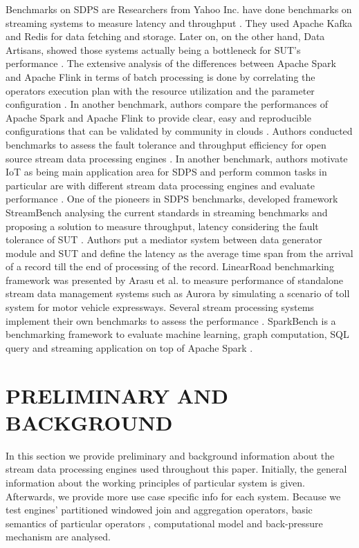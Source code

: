 \documentclass{vldb}
\begin{document}
 Benchmarks on SDPS are  Researchers from Yahoo Inc. have done benchmarks on streaming systems to measure latency and throughput \cite{chintapalli2016benchmarking}. They used Apache Kafka \cite{kafka2014high} and Redis \cite{carlson2013redis} for data fetching and storage. Later on, on the other hand, Data Artisans, showed those systems actually being a bottleneck for SUT's performance \cite{dataartisans}.  The extensive analysis of the differences between Apache Spark and Apache Flink in terms of batch processing is done by correlating the operators execution plan with the resource utilization and the parameter configuration \cite{marcu2016spark}. In another benchmark, authors compare the performances of Apache Spark and Apache Flink to  provide clear, easy and reproducible configurations that can be validated by community in clouds \cite{perera2016reproducible}. Authors conducted  benchmarks to assess the fault tolerance and throughput efficiency for open source stream data processing engines \cite{lopez2016performance}. In another benchmark, authors motivate IoT as being main application area for SDPS and perform common tasks in particular are with different stream data processing engines and evaluate performance \cite{shukla2016benchmarking}. One of the pioneers in SDPS benchmarks, developed framework StreamBench analysing the current standards in streaming benchmarks and proposing a solution to measure throughput, latency considering the fault tolerance of SUT \cite{lu2014stream}. Authors put a mediator system between data generator module and SUT and define the latency as the average time span from the arrival of a record till the end of processing of the record. LinearRoad benchmarking framework was presented by Arasu et al. to measure performance of standalone stream data management systems such as Aurora \cite{abadi2003aurora} by simulating a scenario of toll system for motor vehicle expressways. Several stream processing systems implement their own benchmarks to assess the performance \cite{neumeyer2010s4,qian2013timestream,zaharia2012discretized}. SparkBench is a benchmarking framework to evaluate machine learning, graph computation, SQL query and streaming application on top of Apache Spark \cite{li2015sparkbench}.


\section{PRELIMINARY AND BACKGROUND}


In this section we provide preliminary and background information about the stream data processing engines used throughout this paper.  Initially, the general information about the working principles of particular system is given.  Afterwards, we provide more use case specific info for each system. Because we test engines' partitioned windowed join and  aggregation operators, basic semantics of particular operators , computational model and back-pressure mechanism are analysed.  
\end{document}

